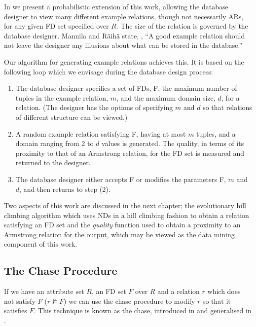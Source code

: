 \medskip

In \cite{cl98c} we present a probabilistic extension of this work,
 allowing the database designer to view many different example
 relations, though not necessarily ARs, for any given FD set specified
 over $R$. The size of the relation is governed by the database designer.
Mannila and R\"{a}ih\"{a} state, \cite{mr86}, ``A good example
 relation should not leave the designer any illusions about what can be stored in the database.''

\medskip

Our algorithm for generating example
 relations achieves this. It is based on the following loop
which we envisage during the database design process:
\begin{enumerate}
\item The database designer specifies a set of FDs, F, 
 the maximum number of tuples in the example relation, $m$, and
the maximum domain size, $d$, for a relation. (The designer
has the options of specifying $m$ and $d$ so that relations
of different structure can be viewed.)
\item A random example relation satisfying F, 
having at most $m$ tuples, and a domain ranging
from 2 to $d$ values is generated. The quality,
in terms of its proximity to that of an Armstrong relation, for the 
FD set is measured and returned to the designer.
\item The database designer either accepts F or modifies the parameters
F, $m$ and $d$, 
and then returns to step (2).
\end{enumerate}

Two aspects of this work are discussed in the next chapter; the
evolutionary hill climbing algorithm which uses NDs in a hill climbing
fashion to obtain a relation satisfying an FD set and the {\em
quality} function used to obtain a proximity to an Armstrong relation
for the output, which may be viewed as the data mining component of
this work.

\subsection{The Chase Procedure}

If we have an attribute set $R$, an FD set $F$ over $R$ and a relation
$r$ which does not satisfy $F$ ($r \not\models F$) we can use the
chase procedure to modify $r$ so that it satisfies $F$. This technique
is known as the chase, introduced in \cite{mms79} and generalised in
\cite{bv84}. 

